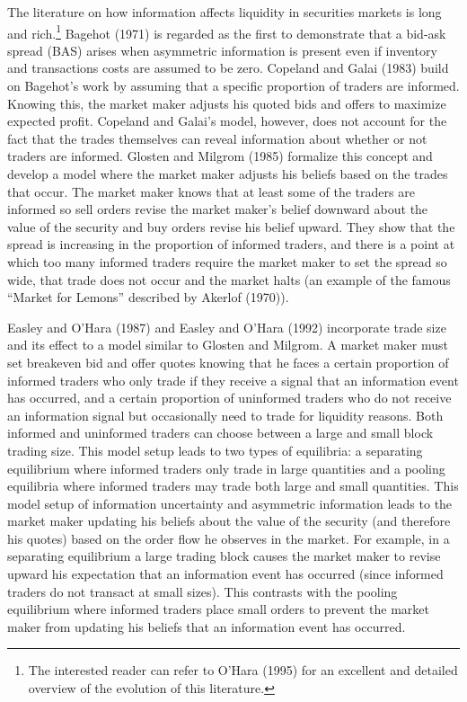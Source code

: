 \documentclass[review,12pt]{elsarticle}
\begin{document}
The literature on how information affects liquidity in securities
markets is long and rich.\footnote{The interested reader can refer to
  O'Hara (1995) for an excellent and detailed overview of the evolution
  of this literature.} Bagehot (1971) is regarded as the first to
demonstrate that a bid-ask spread (BAS) arises when asymmetric
information is present even if inventory and transactions costs are
assumed to be zero. Copeland and Galai (1983) build on Bagehot's work by
assuming that a specific proportion of traders are informed. Knowing
this, the market maker adjusts his quoted bids and offers to maximize
expected profit. Copeland and Galai's model, however, does not account
for the fact that the trades themselves can reveal information about
whether or not traders are informed. Glosten and Milgrom (1985)
formalize this concept and develop a model where the market maker
adjusts his beliefs based on the trades that occur. The market maker
knows that at least some of the traders are informed so sell orders
revise the market maker's belief downward about the value of the
security and buy orders revise his belief upward. They show that the
spread is increasing in the proportion of informed traders, and there is
a point at which too many informed traders require the market maker to
set the spread so wide, that trade does not occur and the market halts
(an example of the famous ``Market for Lemons'' described by Akerlof
(1970)).

Easley and O'Hara (1987) and Easley and O'Hara (1992) incorporate trade
size and its effect to a model similar to Glosten and Milgrom. A market
maker must set breakeven bid and offer quotes knowing that he faces a
certain proportion of informed traders who only trade if they receive a
signal that an information event has occurred, and a certain proportion
of uninformed traders who do not receive an information signal but
occasionally need to trade for liquidity reasons. Both informed and
uninformed traders can choose between a large and small block trading
size. This model setup leads to two types of equilibria: a separating
equilibrium where informed traders only trade in large quantities and a
pooling equilibria where informed traders may trade both large and small
quantities. This model setup of information uncertainty and asymmetric
information leads to the market maker updating his beliefs about the
value of the security (and therefore his quotes) based on the order flow
he observes in the market. For example, in a separating equilibrium a
large trading block causes the market maker to revise upward his
expectation that an information event has occurred (since informed
traders do not transact at small sizes). This contrasts with the pooling
equilibrium where informed traders place small orders to prevent the
market maker from updating his beliefs that an information event has
occurred.
\end{document}
